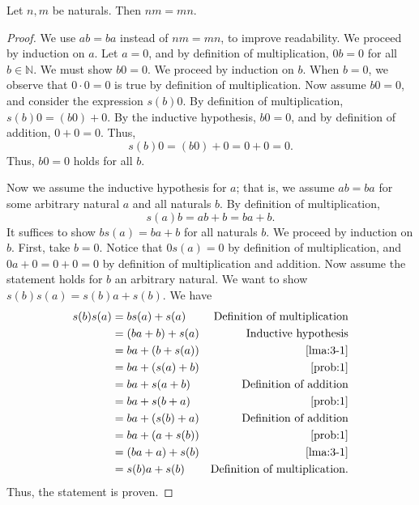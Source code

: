 \documentclass[11pt, letterpaper]{article}
\begin{document}
\begin{problem}\label{prob:4}
	Let $n,m$ be naturals. Then $nm=mn$.
\end{problem}
\begin{proof}
	We use $ab=ba$ instead of $nm=mn$, to improve readability. We proceed by induction on $a$. Let $a=0$, and by definition of multiplication, $0b=0$ for all $b\in\mathbb{N} $. We must show $b0=0$. We proceed by induction on $b$. When $b=0$, we observe that $0\cdot 0=0$ is true by definition of multiplication. Now assume $b0=0$, and consider the expression $s(b)0$. By definition of multiplication, $s(b)0=(b0)+0$. By the inductive hypothesis, $b0=0$, and by definition of addition, $0+0=0$. Thus,
	\[
		s(b)0=(b0)+0 = 0+0=0
	.\]
	Thus, $b0=0$ holds for all $b$.

	Now we assume the inductive hypothesis for $a$; that is, we assume $ab=ba$ for some arbitrary natural $a$ and all naturals $b$. By definition of multiplication, 
	\[
		s(a)b=ab+b = ba+b 
	.\]
	It suffices to show $bs(a)=ba+b$ for all naturals $b$. We proceed by induction on $b$. First, take $b=0$. Notice that $0s(a) = 0$ by definition of multiplication, and $0a + 0 = 0+0=0$ by definition of multiplication and addition. Now assume the statement holds for $b$ an arbitrary natural. We want to show $s(b)s(a) = s(b)a+s(b)$. We have
	\begin{align*}
		s(b)s(a) &=bs(a)+s(a)&\text{Definition of multiplication}\\
			 &=(ba+b)+s(a)&\text{Inductive hypothesis} \\
			 &=ba+(b+s(a))&\text{\Cref{lma:3-1}}\\
			 &=ba+(s(a)+b)&\text{\Cref{prob:1}}\\
			 &=ba+s(a+b)&\text{Definition of addition} \\
			 &=ba+s(b+a)&\text{\Cref{prob:1}} \\
			 &=ba+(s(b)+a)&\text{Definition of addition}  \\
			 &=ba+(a+s(b))&\text{\Cref{prob:1}} \\
			 &=(ba+a)+s(b)&\text{\Cref{lma:3-1}}\\
			 &=s(b)a+s(b)&\text{Definition of multiplication} 
	.\end{align*}
	Thus, the statement is proven.
\end{proof}
\end{document}
